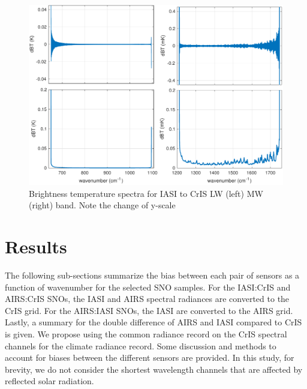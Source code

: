 \documentclass[twocolumn,10pt]{article}
\begin{document}
\begin{figure}[htb]
\centering
\includegraphics[width=\linewidth]{./figs/iasi2cris_validation_LW_MW.pdf}
\caption{\label{fig:orgparagraph1}
  Brightness temperature spectra for IASI to CrIS LW (left) MW (right) band. Note the change of y-scale}
\label{fig:2a}
\end{figure}



\section{Results}
\label{sec:orgheadline12}
The following sub-sections summarize the bias between each pair of sensors as a function of wavenumber for the selected SNO samples. For the IASI:CrIS and AIRS:CrIS SNOs, the IASI and AIRS spectral radiances are converted to the CrIS grid.  For the AIRS:IASI SNOs, the IASI are converted to the AIRS grid. Lastly, a summary for the double difference of AIRS and IASI compared to CrIS is given. We propose using the common radiance record on the CrIS spectral channels for the climate radiance record. Some discussion and methods to account for biases between the different sensors are provided. In this study, for brevity, we do not consider the shortest wavelength channels that are affected by reflected solar radiation.
\end{document}

